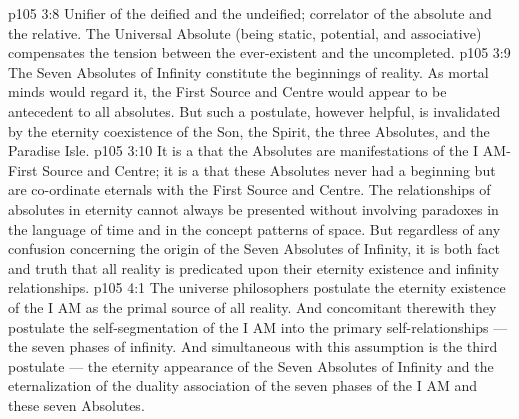 \vs p105 3:8 \bibnobreakspace {} Unifier of the deified and the undeified; correlator of the absolute and the relative. The Universal Absolute (being static, potential, and associative) compensates the tension between the ever\hyp{}existent and the uncompleted.
\vs p105 3:9 \pc The Seven Absolutes of Infinity constitute the beginnings of reality. As mortal minds would regard it, the First Source and Centre would appear to be antecedent to all absolutes. But such a postulate, however helpful, is invalidated by the eternity coexistence of the Son, the Spirit, the three Absolutes, and the Paradise Isle.
\vs p105 3:10 It is a  that the Absolutes are manifestations of the I AM\hyp{}First Source and Centre; it is a  that these Absolutes never had a beginning but are co\hyp{}ordinate eternals with the First Source and Centre. The relationships of absolutes in eternity cannot always be presented without involving paradoxes in the language of time and in the concept patterns of space. But regardless of any confusion concerning the origin of the Seven Absolutes of Infinity, it is both fact and truth that all reality is predicated upon their eternity existence and infinity relationships.
\vs p105 4:1 The universe philosophers postulate the eternity existence of the I AM as the primal source of all reality. And concomitant therewith they postulate the self\hyp{}segmentation of the I AM into the primary self\hyp{}relationships --- the seven phases of infinity. And simultaneous with this assumption is the third postulate --- the eternity appearance of the Seven Absolutes of Infinity and the eternalization of the duality association of the seven phases of the I AM and these seven Absolutes.
